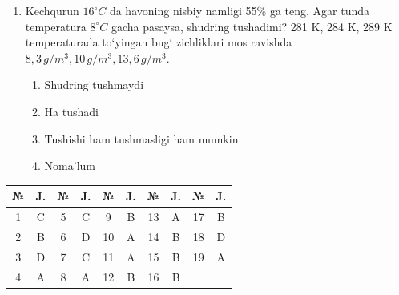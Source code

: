 \begin{enumerate}
\item Kechqurun $16^\circ C$ da havoning nisbiy namligi 55\% ga teng. Agar tunda temperatura $8^\circ C$ gacha pasaysa, shudring tushadimi? 281 K, 284 K, 289 K temperaturada to‘yingan bug‘ zichliklari mos ravishda $8,3 \, g/m^3, 10 \, g/m^3, 13,6 \, g/m^3$.
\begin{enumerate}[label=\Alph*)]
\item Shudring tushmaydi
\item Ha tushadi
\item Tushishi ham tushmasligi ham mumkin
\item Noma'lum
\end{enumerate}

\end{enumerate}



\begin{table}[h!]
\centering
\begin{tabular}{|c|c|c|c|c|c|c|c|c|c|}
\hline
№ & J. & № & J. & № & J. & № & J. & № & J. \\ \hline
1 & C & 5 & C & 9 & B & 13 & A & 17 & B \\ \hline
2 & B & 6 & D & 10 & A & 14 & B & 18 & D \\ \hline
3 & D & 7 & C & 11 & A & 15 & B & 19 & A \\ \hline
4 & A & 8 & A & 12 & B & 16 & B & & \\ \hline
\end{tabular}
\end{table}
